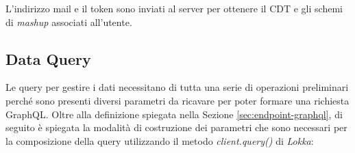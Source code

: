 L'indirizzo mail e il token sono inviati al server per ottenere il CDT e gli schemi di \emph{mashup} associati all'utente.

\subsection{Data Query} \label{sec:data-query}

Le query per gestire i dati necessitano di tutta una serie di operazioni preliminari perché sono presenti diversi parametri da ricavare per poter formare una richiesta GraphQL. Oltre alla definizione spiegata nella Sezione \ref{sec:endpoint-graphql}, di seguito è spiegata la modalità di costruzione dei parametri che sono necessari per la composizione della query utilizzando il metodo \emph{client.query()} di \emph{Lokka}:

